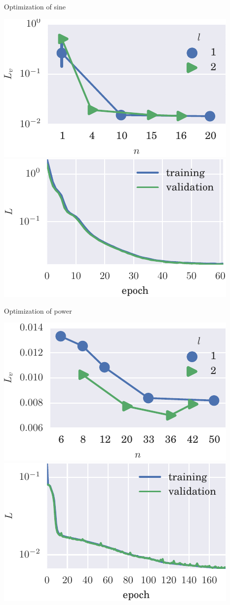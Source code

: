 \documentclass{beamer}
\begin{document}
    \begin{frame}{Optimization of sine}

      \includegraphics[width=.5\textwidth]{figs/bo_sin.pdf}
      \includegraphics[width=.5\textwidth]{figs/trn_sin.pdf}
     
    \end{frame}


    \begin{frame}{Optimization of power}

      \includegraphics[width=.5\textwidth]{figs/bo_power.pdf}
      \includegraphics[width=.5\textwidth]{figs/trn_power.pdf}
      
    \end{frame}
\end{document}

